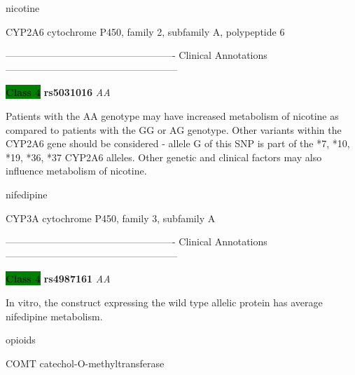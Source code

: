 \documentclass{resume} %
\begin{document}
\begin{rSection}{ nicotine }
\begin{rSubsection}{ CYP2A6 }{ cytochrome P450, family 2, subfamily A, polypeptide 6 }{}{}
\item[] ---------------------------------------------------- Clinical Annotations -----------------------------------------------------\newline
\item \textbf{\colorbox{green} {Class 4}} \textbf{ rs5031016 } \textit{ AA }
\item[] Patients with the AA genotype may have increased metabolism of nicotine as compared to patients with the GG or AG genotype. Other variants within the CYP2A6 gene should be considered - allele G of this SNP is part of the *7, *10, *19, *36, *37 CYP2A6 alleles. Other genetic and clinical factors may also influence metabolism of nicotine.
\end{rSubsection}

\end{rSection}\begin{rSection}{ nifedipine }
\item[]

\begin{rSubsection}{ CYP3A }{ cytochrome P450, family 3, subfamily A }{}{}
\item[]

\item[] ---------------------------------------------------- Clinical Annotations -----------------------------------------------------\newline
\item \textbf{\colorbox{green} {Class 4}} \textbf{ rs4987161 } \textit{ AA }
\item[] In vitro, the construct expressing the wild type allelic protein has average nifedipine metabolism.
\end{rSubsection}

\end{rSection}\begin{rSection}{ opioids }
\item[]

\begin{rSubsection}{ COMT }{ catechol-O-methyltransferase }{}{}
\item[]


\end{rSubsection}
\end{rSection}
\end{document}
